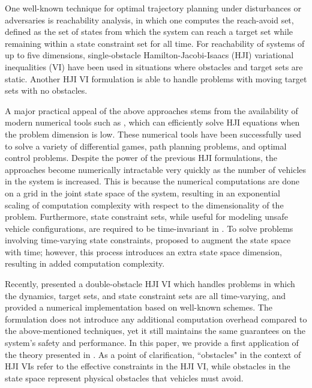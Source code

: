 One well-known technique for optimal trajectory planning under disturbances or adversaries is reachability analysis, in which one computes the reach-avoid set, defined as the set of states from which the system can reach a target set while remaining within a state constraint set for all time. For reachability of systems of up to five dimensions, single-obstacle Hamilton-Jacobi-Isaacs (HJI) variational inequalities (VI) \cite{mitchell05,bokanowski10} have been used in situations where obstacles and target sets are static. Another HJI VI formulation \cite{barron89} is able to handle problems with moving target sets with no obstacles. 

A major practical appeal of the above approaches stems from the availability of modern numerical tools such as \cite{mitchell05, sethian96, osher02, LSToolbox}, which can efficiently solve HJI equations when the problem dimension is low. These numerical tools have been successfully used to solve a variety of differential games, path planning problems, and optimal control problems\cite{mitchell05,ding08,huang11}. %
 Despite the power of the previous HJI formulations, the approaches become numerically intractable very quickly as the number of vehicles in the system is increased. This is because the numerical computations are done on a grid in the joint state space of the system, resulting in an exponential scaling of computation complexity with respect to the dimensionality of the problem. Furthermore, state constraint sets, while useful for modeling unsafe vehicle configurations, are required to be time-invariant in \cite{mitchell05, bokanowski10, mitchell-thesis}. To solve problems involving time-varying state constraints, \cite{bokanowski11} proposed to augment the state space with time; however, this process introduces an extra state space dimension, resulting in added computation complexity.

Recently, \cite{fisac15} presented a double-obstacle HJI VI which handles problems in which the dynamics, target sets, and state constraint sets are all time-varying, and provided a numerical implementation based on well-known schemes. The formulation does not introduce any additional computation overhead compared to the above-mentioned techniques, yet it still maintains the same guarantees on the system's safety and performance. In this paper, we provide a first application of the theory presented in \cite{fisac15}. As a point of clarification, ``obstacles" in the context of HJI VIs refer to the effective constraints in the HJI VI, while obstacles in the state space represent physical obstacles that vehicles must avoid.

